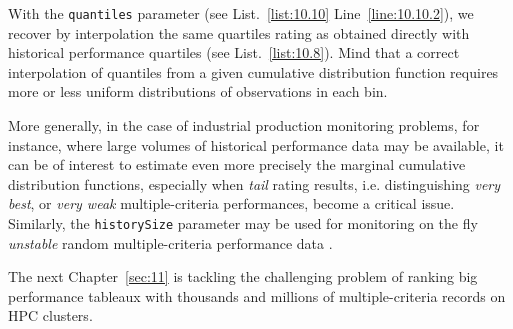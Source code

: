 With the \texttt{quantiles} parameter (see List.~\vref{list:10.10} Line~\ref{line:10.10.2}), we recover by interpolation the same quartiles rating as obtained directly with historical performance quartiles (see List.~\vref{list:10.8}). Mind that a correct interpolation of quantiles from a given cumulative distribution function requires more or less uniform distributions of observations in each bin. 

More generally, in the case of industrial production monitoring problems, for instance, where large volumes of historical performance data may be available, it can be of interest to estimate even more precisely the marginal cumulative distribution functions, especially when \emph{tail} rating results, i.e. distinguishing \emph{very best}, or \emph{very weak} multiple-criteria performances, become a critical issue. Similarly, the \texttt{historySize} parameter may be used for monitoring on the fly \emph{unstable} random multiple-criteria performance data \citep{CHAM-2006}.  	

\vspace{\baselineskip}
The next Chapter~\ref{sec:11} is tackling the challenging problem of ranking big performance tableaux with thousands and millions of multiple-criteria records on HPC clusters. 
{}
{}
 
%
%
